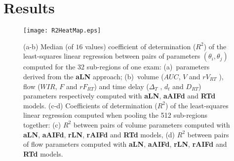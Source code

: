 \section{Results}
\begin{figure}[ht]
  \centering
  \texttt{[image: R2HeatMap.eps]}
  \caption{(a-b) Median (of $16$ values) coefficient of determination ($R^2$) of the least-squares linear regression between pairs of parameters $\left(\theta_i, \theta_j\right)$ computed for the 32 sub-regions of one exam: (a)~parameters derived from the \textbf{aLN} approach; (b)~volume ($AUC$, $V$ and $rV_{RT}$ ), flow ($WIR$, $F$ and $rF_{RT}$) and time delay ($\Delta_T$ , $d_t$ and $D_{RT}$) parameters respectively computed with \textbf{aLN}, \textbf{aAIFd}  and \textbf{RTd} models. (c-d) Coefficients of determination ($R^2$) of the least-squares linear regression computed when pooling the 512 sub-regions  together: (c) $R^2$ between pairs of volume parameters computed with \textbf{aLN}, \textbf{aAIFd}, \textbf{rLN}, \textbf{rAIFd}  and \textbf{RTd} models, (d) $R^2$ between pairs of flow parameters computed with \textbf{aLN}, \textbf{aAIFd}, \textbf{rLN}, \textbf{rAIFd} and \textbf{RTd} models.}
  \label{fig:R2HeatMaps}
\end{figure}

